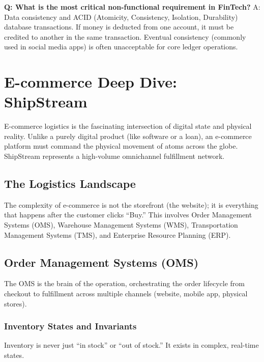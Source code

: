 \documentclass[
  11pt,
  openany,
  oneside]{book}
\begin{document}
\textbf{Q: What is the most critical non-functional requirement in
FinTech?} A: Data consistency and ACID (Atomicity, Consistency,
Isolation, Durability) database transactions. If money is deducted from
one account, it must be credited to another in the same transaction.
Eventual consistency (commonly used in social media apps) is often
unacceptable for core ledger operations.

\bigskip

\section{E-commerce Deep Dive:
ShipStream}\label{e-commerce-deep-dive-shipstream}

E-commerce logistics is the fascinating intersection of digital state
and physical reality. Unlike a purely digital product (like software or
a loan), an e-commerce platform must command the physical movement of
atoms across the globe. ShipStream represents a high-volume omnichannel
fulfillment network.

\subsection{The Logistics Landscape}\label{the-logistics-landscape}

The complexity of e-commerce is not the storefront (the website); it is
everything that happens after the customer clicks ``Buy.'' This involves
Order Management Systems (OMS), Warehouse Management Systems (WMS),
Transportation Management Systems (TMS), and Enterprise Resource
Planning (ERP).

\subsection{Order Management Systems
(OMS)}\label{order-management-systems-oms}

The OMS is the brain of the operation, orchestrating the order lifecycle
from checkout to fulfillment across multiple channels (website, mobile
app, physical stores).

\subsubsection{Inventory States and
Invariants}\label{inventory-states-and-invariants}

Inventory is never just ``in stock'' or ``out of stock.'' It exists in
complex, real-time states.
\end{document}

